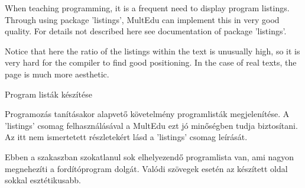 




{
When teaching programming, it is a frequent need to display program listings.
Through using package 'listings', MultEdu can implement this in very good quality.
For details not described here see documentation of package 'listings'.

Notice that here the ratio of the listings within the text is unusually high,
so it is very hard for the compiler to find good positioning. In the case of 
real texts, the page is much more aesthetic.
}
{Program listák készítése}
{
Programozás tanításakor alapvető követelmény programlisták megjelenítése.
A 'listings' csomag felhasználásával a MultEdu ezt jó minőségben tudja biztosítani.
Az itt nem ismertetett részletekért lásd a 'listings' csomag leírását.

Ebben a szakaszban szokatlanul sok elhelyezendő programlista van,
ami nagyon megnehezíti a fordítóprogram dolgát. Valódi szövegek esetén
az készített oldal sokkal esztétikusabb.
}


